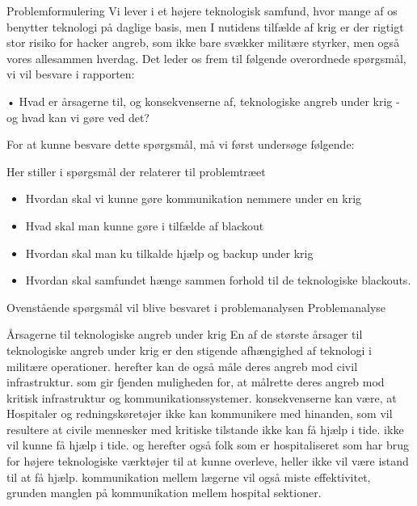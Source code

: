 Problemformulering
Vi lever i et højere teknologisk samfund, hvor mange af os benytter teknologi på daglige basis, men I nutidens tilfælde af krig er der rigtigt stor risiko for hacker angreb, som ikke bare svækker militære styrker, men også vores allesammen hverdag.
Det leder os frem til følgende overordnede spørgsmål, vi vil besvare i rapporten:

•	Hvad er årsagerne til, og konsekvenserne af, teknologiske angreb under krig - og hvad kan vi gøre ved det?

For at kunne besvare dette spørgsmål, må vi først undersøge følgende:

Her stiller i spørgsmål der relaterer til problemtræet
\begin{itemize}
    \item Hvordan skal vi kunne gøre kommunikation nemmere under en krig
    \item Hvad skal man kunne gøre i tilfælde af blackout
    \item Hvordan skal man ku tilkalde hjælp og backup under krig
    \item Hvordan skal samfundet hænge sammen forhold til de teknologiske blackouts.
\end{itemize}

Ovenstående spørgsmål vil blive besvaret i problemanalysen
Problemanalyse

Årsagerne til teknologiske angreb under krig
En af de største årsager til teknologiske angreb under krig er den stigende afhængighed af teknologi i militære operationer.
herefter kan de også måle deres angreb mod civil infrastruktur. som gir fjenden muligheden for, at målrette deres angreb mod kritisk infrastruktur og kommunikationssystemer. konsekvenserne kan være, at Hospitaler og redningskøretøjer ikke kan kommunikere med hinanden, som vil resultere at civile mennesker med kritiske tilstande ikke kan få hjælp i tide.
ikke vil kunne få hjælp i tide. og herefter også folk som er hospitaliseret som har brug for højere teknologiske værktøjer til at kunne overleve, heller ikke vil være istand til at få hjælp. kommunikation mellem lægerne vil også miste effektivitet, grunden manglen på kommunikation mellem hospital sektioner.


